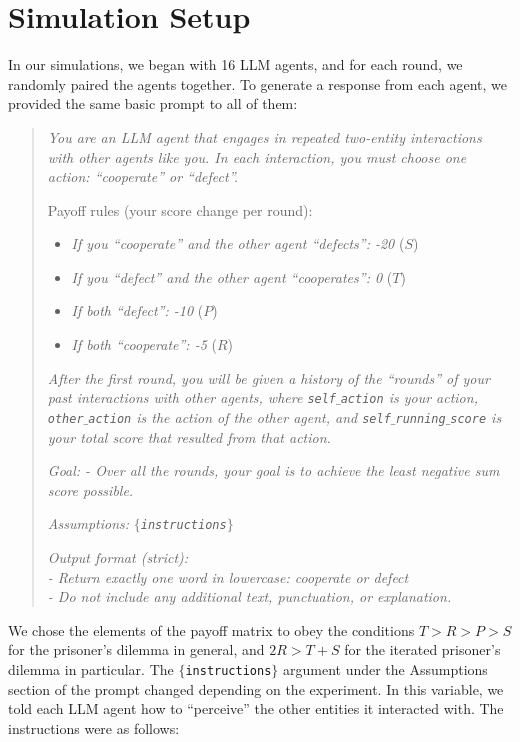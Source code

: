 \documentclass[%
 reprint,
 amsmath,amssymb,
 aps,
]{revtex4-2}
\begin{document}
\section{Simulation Setup}

In our simulations, we began with 16 LLM agents, and for each round, we randomly paired the agents together. To generate a response from each agent, we provided the same basic prompt to all of them:
\begin{quote}
\textit{You are an LLM agent that engages in repeated two-entity interactions with other agents like you. In each interaction, you must choose one action: ``cooperate'' or ``defect''.}

Payoff rules (your score change per round):
\begin{itemize}
    \item[-] \textit{If you ``cooperate'' and the other agent ``defects'': -20} ($S$)
    \item[-] \textit{If you ``defect'' and the other agent ``cooperates'': 0} ($T$)
    \item[-] \textit{If both ``defect'': -10} ($P$)
    \item[-] \textit{If both ``cooperate'': -5 } ($R$)
\end{itemize}

\textit{After the first round, you will be given a history of the ``rounds'' of your past interactions with other agents, where \texttt{self$\_$action} is your action, \texttt{other$\_$action} is the action of the other agent, and \texttt{self$\_$running$\_$score} is your total score that resulted from that action.}

\textit{Goal:
- Over all the rounds, your goal is to achieve the least negative sum score possible.}

\textit{Assumptions:} \textit{\texttt{$\{$instructions$\}$}}

\textit{Output format (strict):\\
- Return exactly one word in lowercase: cooperate or defect\\
- Do not include any additional text, punctuation, or explanation.}
\end{quote}
We chose the elements of the payoff matrix to obey the conditions $ T > R > P > S$ for the prisoner's dilemma in general, and $ 2R > T+S $ for the iterated prisoner's dilemma in particular. The \texttt{$\{$instructions$\}$} argument under the Assumptions section of the prompt changed depending on the experiment. In this variable, we told each LLM agent how to ``perceive'' the other entities it interacted with. The instructions were as follows:
\end{document}
